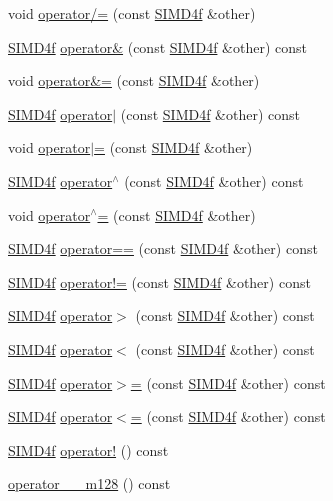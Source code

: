 \begin{DoxyCompactItemize}
\item 
void \hyperlink{class_s_i_m_d4f_a3b6b3c49cfd05e88a3cb69edeef75b6c}{operator/=} (const \hyperlink{class_s_i_m_d4f}{S\+I\+M\+D4f} \&other)
\item 
\hyperlink{class_s_i_m_d4f}{S\+I\+M\+D4f} \hyperlink{class_s_i_m_d4f_a1df8ad0c155adc333d43da786c7fcc69}{operator\&} (const \hyperlink{class_s_i_m_d4f}{S\+I\+M\+D4f} \&other) const 
\item 
void \hyperlink{class_s_i_m_d4f_a870101dc4dff1951f6aa74b01dbd875d}{operator\&=} (const \hyperlink{class_s_i_m_d4f}{S\+I\+M\+D4f} \&other)
\item 
\hyperlink{class_s_i_m_d4f}{S\+I\+M\+D4f} \hyperlink{class_s_i_m_d4f_ae2364977959dbd7e38cfad50b449dab5}{operator$\vert$} (const \hyperlink{class_s_i_m_d4f}{S\+I\+M\+D4f} \&other) const 
\item 
void \hyperlink{class_s_i_m_d4f_a8ff9a65196ceec407c9b3f4adf3a1911}{operator$\vert$=} (const \hyperlink{class_s_i_m_d4f}{S\+I\+M\+D4f} \&other)
\item 
\hyperlink{class_s_i_m_d4f}{S\+I\+M\+D4f} \hyperlink{class_s_i_m_d4f_a0aac563f1f7e9326b84a78d04995041a}{operator$^\wedge$} (const \hyperlink{class_s_i_m_d4f}{S\+I\+M\+D4f} \&other) const 
\item 
void \hyperlink{class_s_i_m_d4f_a27c17c6b57f44045fb33c0427e33210b}{operator$^\wedge$=} (const \hyperlink{class_s_i_m_d4f}{S\+I\+M\+D4f} \&other)
\item 
\hyperlink{class_s_i_m_d4f}{S\+I\+M\+D4f} \hyperlink{class_s_i_m_d4f_ade3596e82e7765959b1c4d88b6677d5e}{operator==} (const \hyperlink{class_s_i_m_d4f}{S\+I\+M\+D4f} \&other) const 
\item 
\hyperlink{class_s_i_m_d4f}{S\+I\+M\+D4f} \hyperlink{class_s_i_m_d4f_a57b8179ec1d84168c1652b5426fa3a23}{operator!=} (const \hyperlink{class_s_i_m_d4f}{S\+I\+M\+D4f} \&other) const 
\item 
\hyperlink{class_s_i_m_d4f}{S\+I\+M\+D4f} \hyperlink{class_s_i_m_d4f_aa82f83875606b53854dda2484561c435}{operator$>$} (const \hyperlink{class_s_i_m_d4f}{S\+I\+M\+D4f} \&other) const 
\item 
\hyperlink{class_s_i_m_d4f}{S\+I\+M\+D4f} \hyperlink{class_s_i_m_d4f_ad94926234ab8e74f007d137135ef6990}{operator$<$} (const \hyperlink{class_s_i_m_d4f}{S\+I\+M\+D4f} \&other) const 
\item 
\hyperlink{class_s_i_m_d4f}{S\+I\+M\+D4f} \hyperlink{class_s_i_m_d4f_ab335c298dcef73b1e1e67500bfc5cbea}{operator$>$=} (const \hyperlink{class_s_i_m_d4f}{S\+I\+M\+D4f} \&other) const 
\item 
\hyperlink{class_s_i_m_d4f}{S\+I\+M\+D4f} \hyperlink{class_s_i_m_d4f_a58edb1a5141a88422c789201633c22fc}{operator$<$=} (const \hyperlink{class_s_i_m_d4f}{S\+I\+M\+D4f} \&other) const 
\item 
\hyperlink{class_s_i_m_d4f}{S\+I\+M\+D4f} \hyperlink{class_s_i_m_d4f_af9f8304a6372911aae73c04bae766dc8}{operator!} () const 
\item 
\hyperlink{class_s_i_m_d4f_aff52214289656c2e89262fe874b5869c}{operator \+\_\+\+\_\+m128} () const 
\end{DoxyCompactItemize}


